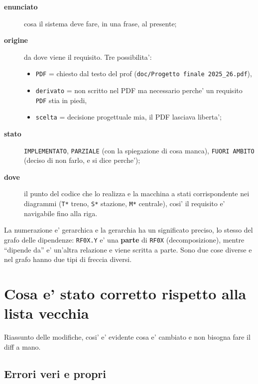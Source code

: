 \documentclass[11pt]{article}
\begin{document}
\begin{description}
\item[{\textbf{enunciato}}] cosa il sistema deve fare, in una frase, al presente;
\item[{\textbf{origine}}] da dove viene il requisito. Tre possibilita':
\begin{itemize}
\item \texttt{PDF} = chiesto dal testo del prof (\texttt{doc/Progetto finale 2025\_26.pdf}),
\item \texttt{derivato} = non scritto nel PDF ma necessario perche' un requisito \texttt{PDF} stia in piedi,
\item \texttt{scelta} = decisione progettuale mia, il PDF lasciava liberta';
\end{itemize}
\item[{\textbf{stato}}] \texttt{IMPLEMENTATO}, \texttt{PARZIALE} (con la spiegazione di cosa manca), \texttt{FUORI AMBITO} (deciso
di non farlo, e si dice perche');
\item[{\textbf{dove}}] il punto del codice che lo realizza e la macchina a stati corrispondente nei diagrammi
(\texttt{T*} treno, \texttt{S*} stazione, \texttt{M*} centrale), cosi' il requisito e' navigabile fino alla riga.
\end{description}

La numerazione e' gerarchica e la gerarchia ha un significato preciso, lo stesso del grafo delle
dipendenze: \texttt{RF0X.Y} e' una \textbf{parte} di \texttt{RF0X} (decomposizione), mentre ``dipende da'' e' un'altra
relazione e viene scritta a parte. Sono due cose diverse e nel grafo hanno due tipi di freccia
diversi.
\section{Cosa e' stato corretto rispetto alla lista vecchia}
\label{sec:orgae8510d}

Riassunto delle modifiche, cosi' e' evidente cosa e' cambiato e non bisogna fare il diff a mano.
\subsection{Errori veri e propri}
\label{sec:org479ef90}
\end{document}
